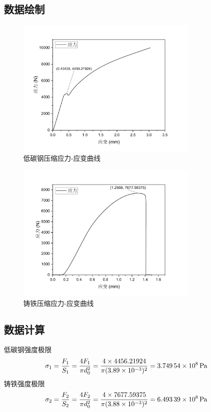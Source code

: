 \documentclass[a4paper,utf8]{article}
\begin{document}
    \subsection{数据绘制}
    \begin{figure}[!ht]
        \caption{低碳钢压缩应力-应变曲线}
        \includegraphics[width=0.8\textwidth]{steelPush.pdf}
    \end{figure}
    \begin{figure}[!ht]
        \caption{铸铁压缩应力-应变曲线}
        \includegraphics[width=0.8\textwidth]{ironPush.pdf}
    \end{figure}

    \subsection{数据计算}
    \noindent 低碳钢强度极限
    \begin{equation}
        \sigma_1=\frac{F_1}{S_{1}}=\frac{4 F_1}{\pi d_{0}^2}=\frac{4\times 4456.21924}{\pi(3.89\times 10^{-3})^{2}}=\SI{3.74954d8}{\Pa}
    \end{equation}
    铸铁强度极限
    \begin{equation}
        \sigma_2=\frac{F_2}{S_{2}}=\frac{4 F_2}{\pi d_{0}^2}=\frac{4\times  7677.59375}{\pi(3.88\times 10^{-3})^{2}}=\SI{6.49339d8}{\Pa}
    \end{equation}
\end{document}
